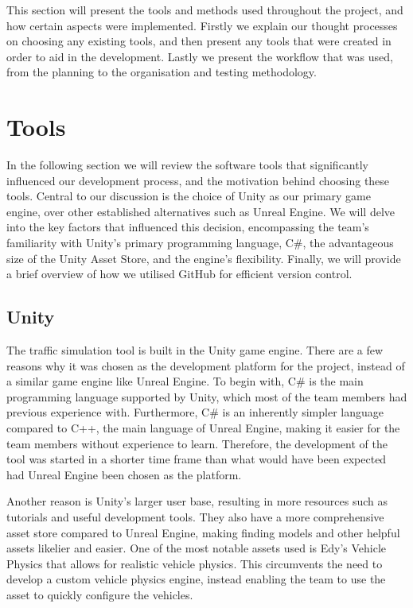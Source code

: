 
This section will present the tools and methods used throughout the project, and how certain aspects were implemented. Firstly we explain our thought processes on choosing any existing tools, and then present any tools that were created in order to aid in the development. Lastly we present the workflow that was used, from the planning to the organisation and testing methodology.

\section{Tools}
    In the following section we will review the software tools that significantly influenced our development process, and the motivation behind choosing these tools. Central to our discussion is the choice of Unity as our primary game engine, over other established alternatives such as Unreal Engine. We will delve into the key factors that influenced this decision, encompassing the team's familiarity with Unity's primary programming language, C\#, the advantageous size of the Unity Asset Store, and the engine's flexibility. Finally, we will provide a brief overview of how we utilised GitHub for efficient version control.

    \subsection{Unity}
        The traffic simulation tool is built in the Unity game engine. There are a few reasons why it was chosen as the development platform for the project, instead of a similar game engine like Unreal Engine. To begin with, C\# is the main programming language supported by Unity, which most of the team members had previous experience with. Furthermore, C\# is an inherently simpler language compared to C++, the main language of Unreal Engine, making it easier for the team members without experience to learn. Therefore, the development of the tool was started in a shorter time frame than what would have been expected had Unreal Engine been chosen as the platform.

        Another reason is Unity's larger user base, resulting in more resources such as tutorials and useful development tools. They also have a more comprehensive asset store compared to Unreal Engine, making finding models and other helpful assets likelier and easier. One of the most notable assets used is Edy's Vehicle Physics that allows for realistic vehicle physics\cite{edy}. This circumvents the need to develop a custom vehicle physics engine, instead enabling the team to use the asset to quickly configure the vehicles.

